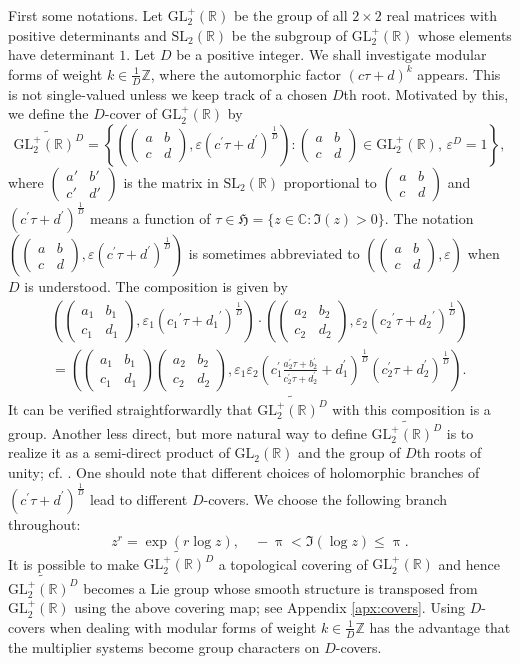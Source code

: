 \documentclass[12pt]{amsart}
\numberwithin{equation}{section}
\theoremstyle{plain}
\theoremstyle{definition}
\theoremstyle{remark}
\newcommand\tbtmat[4]{\left(\begin{smallmatrix}{#1} & {#2} \\ {#3} & {#4}\end{smallmatrix}\right)}
\newcommand\numZ{\mathbb{Z}}
\newcommand\numC{\mathbb{C}}
\newcommand\glR{\mathrm{GL}_2(\mathbb{R})}
\newcommand\slR{\mathrm{SL}_2(\mathbb{R})}
\newcommand\glpR{\mathrm{GL}_2^{+}(\mathbb{R})}
\newcommand\uhp{\mathfrak{H}}
\newcommand\eleglptRaDp[6]{\left(\left(\begin{smallmatrix}{#1} & {#2} \\ {#3} & {#4}\end{smallmatrix}\right),{#5}\left({#3}^\prime \tau+{#4}^\prime \right)^{\frac{1}{#6}}\right)}
\newcommand\elesltRaDs[5]{\left(\left(\begin{smallmatrix}{#1} & {#2} \\ {#3} & {#4}\end{smallmatrix}\right),{#5}\right)}
\newcommand\Dcover[2]{\widetilde{#1^{#2}}}
\begin{document}
First some notations. Let $\glpR$ be the group of all $2\times 2$ real matrices with positive determinants and $\slR$ be the subgroup of $\glpR$ whose elements have determinant $1$. Let $D$ be a positive integer. We shall investigate modular forms of weight $k\in\frac{1}{D}\numZ$, where the automorphic factor $(c\tau+d)^{k}$ appears. This is not single-valued unless we keep track of a chosen $D$th root. Motivated by this, we define the $D$-cover of $\glpR$ by
\begin{equation}
\label{eq:Dcover}
\Dcover{\glpR}{D}=\left\{\eleglptRaDp{a}{b}{c}{d}{\varepsilon}{D} \colon \tbtmat{a}{b}{c}{d} \in \glpR,\, \varepsilon^D=1\right\},
\end{equation}
where $\tbtmat{a'}{b'}{c'}{d'}$ is the matrix in $\slR$ proportional to $\tbtmat{a}{b}{c}{d}$ and $\left(c^\prime \tau+d^\prime \right)^{\frac{1}{D}}$ means a function of $\tau\in\uhp=\{z\in\numC\colon \Im(z)>0\}$. The notation $\eleglptRaDp{a}{b}{c}{d}{\varepsilon}{D}$ is sometimes abbreviated to $\elesltRaDs{a}{b}{c}{d}{\varepsilon}$ when $D$ is understood. The composition is given by
\begin{multline}
\label{eq:multplicationCover}
\eleglptRaDp{a_1}{b_1}{c_1}{d_1}{\varepsilon_1}{D}\cdot\eleglptRaDp{a_2}{b_2}{c_2}{d_2}{\varepsilon_2}{D} \\
= \left(\left(\begin{smallmatrix} a_1 & b_1 \\ c_1 & d_1\end{smallmatrix}\right)\left(\begin{smallmatrix} a_2 & b_2 \\ c_2 & d_2\end{smallmatrix}\right),\varepsilon_1\varepsilon_2\left(c_1^\prime\frac{a_2^\prime\tau+b_2^\prime}{c_2^\prime\tau+d_2^\prime}+d_1^\prime\right)^\frac{1}{D}\left(c_2^\prime\tau+d_2^\prime\right)^\frac{1}{D}\right).
\end{multline}
It can be verified straightforwardly that $\Dcover{\glpR}{D}$ with this composition is a group. Another less direct, but more natural way to define $\Dcover{\glpR}{D}$ is to realize it as a semi-direct product of $\glR$ and the group of $D$th roots of unity; cf. \cite[Lemma 1.1.3]{CS17}. One should note that different choices of holomorphic branches of $\left(c^\prime \tau+d^\prime \right)^{\frac{1}{D}}$ lead to different $D$-covers. We choose the following branch throughout:
\begin{equation}
\label{eq:branchRoot}
z^{r}=\exp\left(r\log z\right),\quad -\uppi < \Im(\log z) \leq \uppi.
\end{equation}
It is possible to make $\Dcover{\glpR}{D}$ a topological covering of $\glpR$ and hence $\Dcover{\glpR}{D}$ becomes a Lie group whose smooth structure is transposed from $\glpR$ using the above covering map; see Appendix \ref{apx:covers}. Using $D$-covers when dealing with modular forms of weight $k\in\frac{1}{D}\numZ$ has the advantage that the multiplier systems become group characters on $D$-covers.
\end{document}
